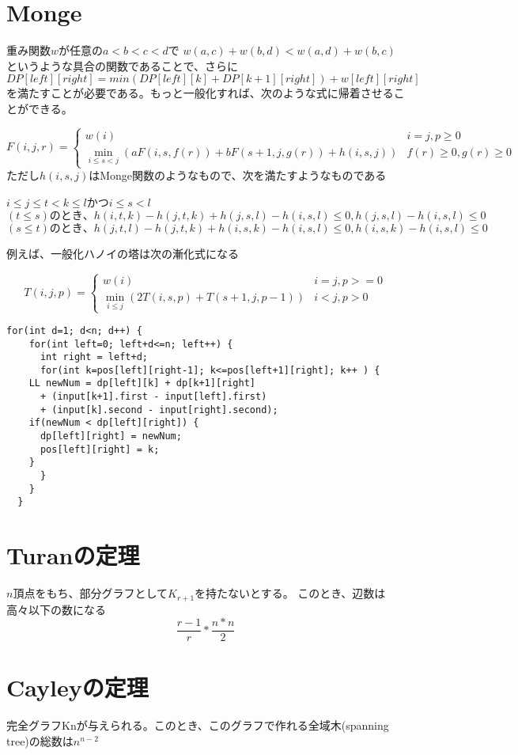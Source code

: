 \section{Monge}
重み関数$w$が任意の$a<b<c<d$で $w(a,c)+w(b,d)<w(a,d)+w(b,c)$というような具合の関数であることで、さらに$DP[left][right] = min(DP[left][k] + DP[k+1][right])+w[left][right]$を満たすことが必要である。もっと一般化すれば、次のような式に帰着させることができる。

\[
F(i,j,r) = \begin{cases}
  w(i) & i=j , p \geq 0 \\
  \min_{i \leq s <j} ( aF(i,s,f(r)) + bF(s+1,j,g(r)) +h(i,s,j) ) & f(r) \geq 0 , g(r) \geq 0
\end{cases} \]
 ただし$h(i,s,j)$はMonge関数のようなもので、次を満たすようなものである

$i \leq j \leq t < k \leq l$かつ$i \leq s < l$
\[
(t\leq s)のとき、 h(i,t,k) - h(j,t,k) + h(j,s,l) - h(i,s,l) \leq 0 , h(j,s,l) - h(i,s,l) \leq 0 \]
\[
(s \leq t)のとき、h(j,t,l) - h(j,t,k) + h(i,s,k) - h(i,s,l) \leq 0, h(i,s,k) - h(i,s,l) \leq 0 \]



例えば、一般化ハノイの塔は次の漸化式になる

\[
T(i,j,p) = \begin{cases}
w(i) & i=j , p>=0  \\
\min_{i \leq j}(2T(i,s,p) + T(s+1,j,p-1)) & i<j, p>0

\end{cases} \]
\begin{lstlisting}[caption=MongeDP]
  for(int d=1; d<n; d++) {
    for(int left=0; left+d<=n; left++) {
      int right = left+d;
      for(int k=pos[left][right-1]; k<=pos[left+1][right]; k++ ) {
	LL newNum = dp[left][k] + dp[k+1][right]
	  + (input[k+1].first - input[left].first)
	  + (input[k].second - input[right].second);
	if(newNum < dp[left][right]) {
	  dp[left][right] = newNum;
	  pos[left][right] = k;	  
	}
      }
    }
  } 
\end{lstlisting}


\section{Turanの定理}
$n$頂点をもち、部分グラフとして$K_{r+1}$を持たないとする。
このとき、辺数は高々以下の数になる
\[\frac{r-1}{r} * \frac{n*n}{2}\]

\section{Cayleyの定理}
完全グラフKnが与えられる。このとき、このグラフで作れる全域木(spanning tree)の総数は$n^{n-2}$\\

